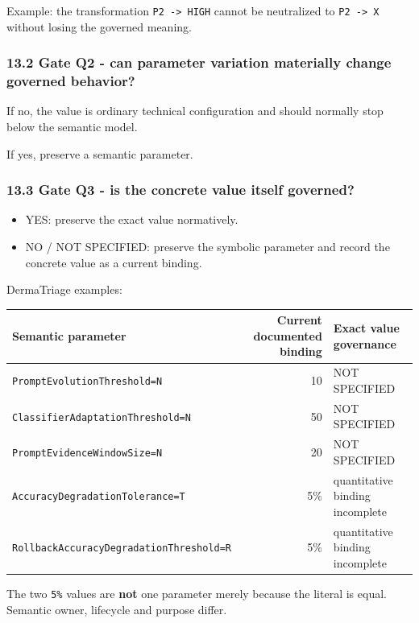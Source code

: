 \documentclass[11pt,a4paper]{article}
\providecommand{\tightlist}{\setlength{\itemsep}{0pt}\setlength{\parskip}{0pt}}
\begin{document}
Example: the transformation \texttt{P2\ -\textgreater{}\ HIGH} cannot be
neutralized to \texttt{P2\ -\textgreater{}\ X} without losing the
governed meaning.

\subsubsection{13.2 Gate Q2 - can parameter variation materially change
governed
behavior?}\label{132-gate-q2---can-parameter-variation-materially-change-governed-behavior}

If no, the value is ordinary technical configuration and should normally
stop below the semantic model.

If yes, preserve a semantic parameter.

\subsubsection{13.3 Gate Q3 - is the concrete value itself
governed?}\label{133-gate-q3---is-the-concrete-value-itself-governed}

\begin{itemize}
\tightlist
\item
  YES: preserve the exact value normatively.
\item
  NO / NOT SPECIFIED: preserve the symbolic parameter and record the
  concrete value as a current binding.
\end{itemize}

DermaTriage examples:

\begin{longtable}[]{@{}lrl@{}}
\toprule\noalign{}
Semantic parameter & Current documented binding & Exact value
governance \\
\midrule\noalign{}
\endhead
\bottomrule\noalign{}
\endlastfoot
\texttt{PromptEvolutionThreshold=N} & 10 & NOT SPECIFIED \\
\texttt{ClassifierAdaptationThreshold=N} & 50 & NOT SPECIFIED \\
\texttt{PromptEvidenceWindowSize=N} & 20 & NOT SPECIFIED \\
\texttt{AccuracyDegradationTolerance=T} & 5\% & quantitative binding
incomplete \\
\texttt{RollbackAccuracyDegradationThreshold=R} & 5\% & quantitative
binding incomplete \\
\end{longtable}

The two \texttt{5\%} values are \textbf{not} one parameter merely
because the literal is equal. Semantic owner, lifecycle and purpose
differ.
\end{document}
